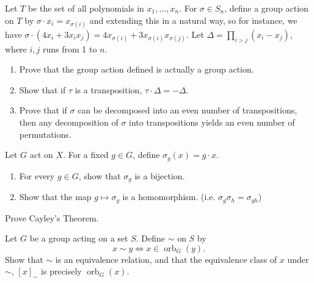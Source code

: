 \documentclass[./main.tex]{subfiles}
\begin{document}
\begin{exercise}
\label{exercise:permutation-sign-using-group-actions}
    Let $T$ be the set of all polynomials in $x_1, \dots, x_n$. For $\sigma \in
    S_n$, define a group action on $T$ by $\sigma \cdot x_i = x_{\sigma(i)}$ and
    extending this in a natural way, so for instance, we have $\sigma \cdot (4x_i
    + 3x_i x_j) = 4x_{\sigma(i)} + 3 x_{\sigma(i)} x_{\sigma(j)}$. Let $\Delta =
    \prod_{i > j} (x_i - x_j)$, where $i, j$ runs from 1 to $n$.
    
    \begin{enumerate}
        \item Prove that the group action defined is actually a group action.
        \item Show that if $\tau$ is a transposition, $\tau \cdot \Delta = -\Delta$.
        \item Prove that if $\sigma$ can be decomposed into an even number of
        transpositions, then any decomposition of $\sigma$ into transpositions
        yields an even number of permutations.
    \end{enumerate}
\end{exercise}

\begin{exercise}
\label{ex:group-actions-symmetric-group}
    Let $G$ act on $X$. For a fixed $g \in G$, define $\sigma_g(x) = g \cdot x$. 
    \begin{enumerate}
        \item For every $g \in G$, show that $\sigma_g$ is a bijection.
        \item Show that the map $g \mapsto \sigma_g$ is a homomorphism. (i.e.
        $\sigma_g \sigma_h = \sigma_{gh}$)
    \end{enumerate}
\end{exercise}

\begin{exercise}
\label{ex:cayley-thm}
    Prove Cayley's Theorem. 
\end{exercise}

\begin{exercise}
\label{ex:orbits-partition-set}
    Let $G$ be a group acting on a set $S$. Define $\sim$ on $S$ by
    \[
        x \sim y \iff x \in \operatorname{orb}_G (y).
    \]
    Show that $\sim$ is an equivalence relation, and that the equivalence class
    of $x$ under $\sim$, $[x]_\sim$ is precisely $\operatorname{orb}_G(x)$. 
\end{exercise}
\end{document}
